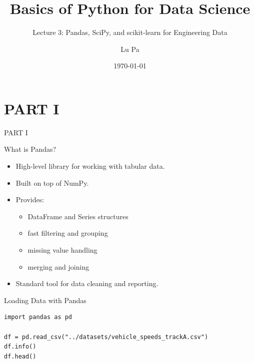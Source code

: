 \documentclass[aspectratio=169]{beamer}
\title{Basics of Python for Data Science}
\subtitle{Lecture 3: Pandas, SciPy, and scikit-learn for Engineering Data}
\author{Lu Pa}
\date{\today}
\begin{document}
\begin{frame}
  \titlepage
\end{frame}

\section{PART I}
\begin{frame}[plain]
  \begin{center}
    \vspace{2cm}
    {\color{white}\Huge PART I}
  \end{center}
\end{frame}

\begin{frame}{What is Pandas?}
  \begin{itemize}
    \item High-level library for working with tabular data.
    \item Built on top of NumPy.
    \item Provides:
      \begin{itemize}
        \item DataFrame and Series structures
        \item fast filtering and grouping
        \item missing value handling
        \item merging and joining
      \end{itemize}
    \item Standard tool for data cleaning and reporting.
  \end{itemize}
\end{frame}

\begin{frame}[fragile]{Loading Data with Pandas}
\begin{verbatim}
import pandas as pd

df = pd.read_csv("../datasets/vehicle_speeds_trackA.csv")
df.info()
df.head()
\end{verbatim}
\end{frame}
\end{document}
